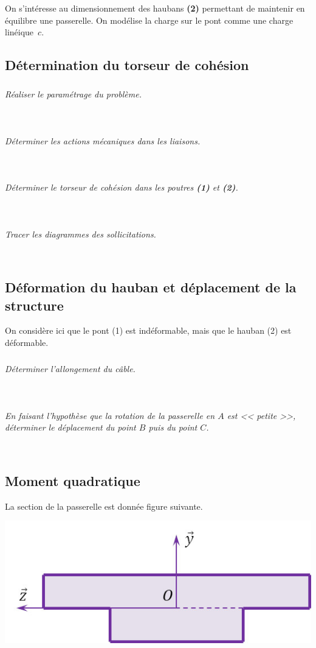 \documentclass[10pt,fleqn]{article} %
\begin{document}
\begin{multicols}{2}
On s'intéresse au dimensionnement des haubans \textbf{(2)} permettant de maintenir en équilibre une passerelle.
On modélise la charge sur le pont comme une charge linéique~$c$.

\subsection*{Détermination du torseur de cohésion}
\subparagraph{}\textit{Réaliser le paramétrage du problème.}
\ifprof
\begin{corrige}~\\
\end{corrige}
\else
\fi

\subparagraph{}\textit{Déterminer les actions mécaniques dans les liaisons.}
\ifprof
\begin{corrige}~\\
\end{corrige}
\else
\fi

\subparagraph{}\textit{Déterminer le torseur de cohésion dans les poutres \textbf{(1)} et \textbf{(2)}.}
\ifprof
\begin{corrige}~\\
\end{corrige}
\else
\fi

\subparagraph{}\textit{Tracer les diagrammes des sollicitations.}
\ifprof
\begin{corrige}~\\
\end{corrige}
\else
\fi


\subsection*{Déformation du hauban et déplacement de la structure}
On considère ici que le pont (1) est indéformable, mais que le hauban (2) est déformable. 
\subparagraph{}\textit{Déterminer l'allongement du câble.}
\ifprof
\begin{corrige}~\\
\end{corrige}
\else
\fi

\subparagraph{}\textit{En faisant l'hypothèse que la rotation de la passerelle en $A$ est << petite >>, déterminer le déplacement du point $B$ puis du point $C$. }
\ifprof
\begin{corrige}~\\
\end{corrige}
\else
\fi

\subsection*{Moment quadratique}
La section de la passerelle est donnée figure suivante. 
\begin{center}
\includegraphics[width=.65\linewidth]{images/fig_04}


\end{center}
\end{multicols}
\end{document}
